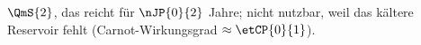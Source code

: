 $\QmS{2}$, das reicht für $\nJP{0}{2}$ Jahre; nicht nutzbar, weil das kältere Reservoir fehlt (Carnot-Wirkungsgrad $\approx \etCP{0}{1}$).
